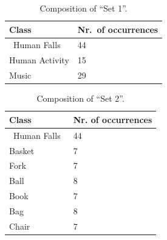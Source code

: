 \begin{table}[t]
	\centering

	\caption{Composition  of ``Set 1''.}
	\label{tab:set1Composition}
	\begin{center}
		\begin{tabular}{K{3cm}K{3cm}}				
			\hline
			\textbf{Class} & \textbf{Nr.\ of occurrences} \\ 
			\hline
			$\,$ Human Falls $\,$ 	& 44    			\\
			Human Activity  		& 15		\\
			Music			  		& 29		\\
			\hline
		\end{tabular}			
	\end{center}		

\end{table}

\begin{table}[t]
	\centering
		
	\caption{Composition  of ``Set 2''.}
	\label{tab:set2Composition}
	\begin{center}
		
		\begin{tabular}{K{3cm}K{3cm}}
			
			\hline
			\textbf{Class} & \textbf{Nr. of occurrences} \\ 
			\hline
			$\,$ Human Falls $\,$ 	& 44    		\\				
			Basket      			& 7           	 \\
			Fork        			& 7           	 \\
			Ball       			& 8           	 \\
			Book        			& 7          	  \\
			Bag         			& 8          	  \\
			Chair       			& 7    			\\
			
			\hline
		\end{tabular}
		
	\end{center}
	
\end{table}



